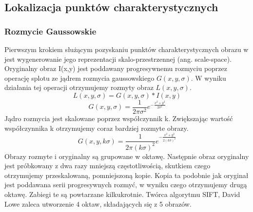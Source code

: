 \subsection{Lokalizacja punktów charakterystycznych}
\subsubsection{Rozmycie Gaussowskie}
Pierwszym krokiem służącym pozyskaniu punktów charakterystycznych obrazu w jest wygenerowanie jego reprezentacji skalo-przestrzennej (ang. scale-space).  Oryginalny obraz I(x,y) jest poddawany progresywnemu rozmyciu poprzez operację splotu ze jądrem rozmycia gaussowskiego $G(x,y,\sigma)$. W wyniku działania tej operacji otrzymujemy rozmyty obraz $L(x,y,\sigma)$. 
\begin{equation}
L(x,y,\sigma) = G(x,y,\sigma) * I(x,y)
\end{equation}
\begin{equation}
G(x,y,\sigma) = \frac{1}{2\pi\sigma^2}e^{-\frac{x^2+y^2}{2\sigma^2}}
\end{equation}
Jądro rozmycia jest skalowane poprzez współczynnik k. Zwiększając wartość współczynnika k otrzymujemy coraz bardziej rozmyte obrazy. 
\begin{equation}
G(x,y,k\sigma) = \frac{1}{2\pi(k\sigma)^2}e^{-\frac{x^2+y^2}{2(k\sigma)^2}}
\end{equation}
Obrazy rozmyte i oryginalny są grupowane w oktawę. Następnie obraz oryginalny jest próbkowany z dwa razy mniejszą częstotliwością, skutkiem czego  otrzymujemy przeskalowaną, pomniejszoną kopie. Kopia ta podobnie jak oryginał jest poddawana serii progresywnych rozmyć, w wyniku czego otrzymujemy drugą oktawę. Zabiegi te są powtarzane kilkukrotnie. Twórca algorytmu SIFT, David Lowe zaleca utworzenie 4 oktaw, składających się z 5 obrazów.
